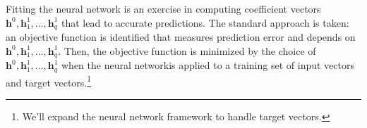 \documentclass[graybox,envcountchap]{svmono}
\newcommand{\hf}{\mathbf{h}}
\newcommand{\xf}{\mathbf{x}}
\newcommand{\nn}{neural network}
\begin{document}
Fitting the {\nn } is an exercise in computing coefficient vectors $\mathbf{h}^0,\hf_1^1, \ldots, \hf_q^1$ that lead to accurate predictions.  The standard approach is taken: an objective function is identified that measures prediction error and depends on $\mathbf{h}^0,\hf_1^1, \ldots, \hf_q^1$.  Then, the objective function is minimized by the choice of $\mathbf{h}^0, \hf_1^1, \ldots, \hf_q^1$ when the {\nn }is applied to a training set of input vectors and target vectors.\footnote{We'll expand the {\nn } framework to handle target vectors.}
\begin{comment}
An example is the determination of tumor cell type (benign or malignant) based on measurements of cell morphology. The measurements on cell morphology comprise the input vector $\xf$.
In general, more layers imply better  prediction, and so we distinguish between shallow (few  layers) and deep (many layers) \nn s. For example, if there were two hidden layers, then we need two sets of hidden layer coefficient vectors, say, $\{\hf^1_1, \ldots, \hf^1_{q} \}$, and $\{\hf^0_1, \ldots, \hf^0_{r}\}$. 

As most of us are aware, digital data is being generated  at an astounding yet increasing velocity because of advances in instrumentation.\footnote{Instrumentation in this context encompasses the internet, the internet of things, smart phones, and digital cameras, and other devices.}  The opportunities for extracting useful information from data are expanding, but doing so is often very difficult. One solution is to increase computing power.  Massively large distributed computing networks are becoming more accessible and easier to use.\footnote{We refer to cloud-based computing. It's still challenging for the occasional user but given the competition between the Google, Amazon, and others to deliver cloud-based computing as a service, it's undoubtedly going to become easy.} Artificial \nn s, which are depend on large data set to work well,  will become more useful and more important, perhaps even dominant, in the near future. Our conjecture is supported by recent technological successes with autonomous cars, facial recognition systems, and machine-based language translation systems (all heavily dependent on artificial \nn s.)\footnote{One may debate whether these innovations are good, but even if you think not and want to fight against it, Luddite, you should know what you are up against. }

The topic of artificial \nn s is approached herein from a mathematical perspective since mathematics is the foundation of \nn s. Ultimately, those that understand the artificial {\nn } from the foundations up will be best equipped to exploit \nn s.
\end{comment}
\end{document}
